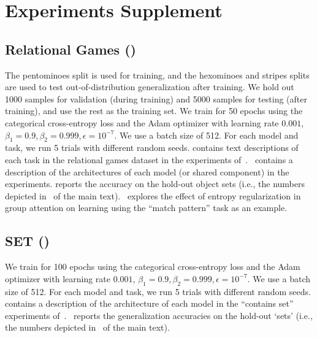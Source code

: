 \section{Experiments Supplement}\label{sec:experiments_supplement}

\subsection{Relational Games ()}

The pentominoes split is used for training, and the hexominoes and stripes splits are used to test out-of-distribution generalization after training. We hold out 1000 samples for validation (during training) and 5000 samples for testing (after training), and use the rest as the training set. We train for 50 epochs using the categorical cross-entropy loss and the Adam optimizer with learning rate $0.001$, $\beta_1 = 0.9, \beta_2 = 0.999, \epsilon = 10^{-7}$. We use a batch size of 512. For each model and task, we run 5 trials with different random seeds. contains text descriptions of each task in the relational games dataset in the experiments of~.~ contains a description of the architectures of each model (or shared component) in the experiments.
 reports the accuracy on the hold-out object sets (i.e., the numbers depicted in~ of the main text).~ explores the effect of entropy regularization in group attention on learning using the ``match pattern'' task as an example.


\subsection{SET ()}

We train for 100 epochs using the categorical cross-entropy loss and the Adam optimizer with learning rate $0.001$, $\beta_1 = 0.9, \beta_2 = 0.999, \epsilon = 10^{-7}$. We use a batch size of 512. For each model and task, we run 5 trials with different random seeds. contains a description of the architecture of each model in the ``contains set'' experiments of~.~ reports the generalization accuracies on the hold-out `sets' (i.e., the numbers depicted in~ of the main text).

